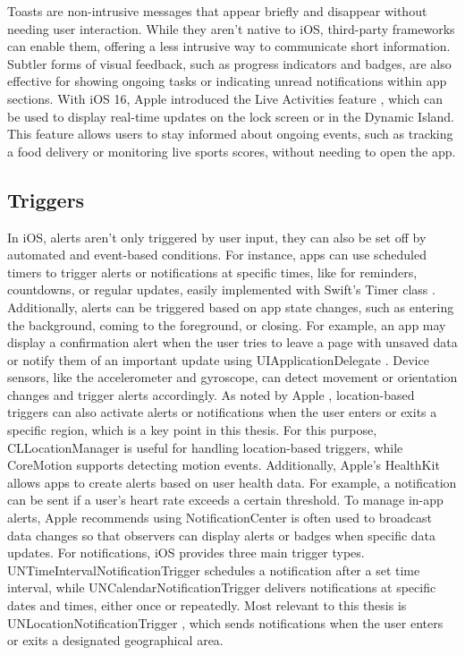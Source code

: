 Toasts are non-intrusive messages that appear briefly and disappear without needing user interaction. While they aren't native to iOS, third-party frameworks can enable them, offering a less intrusive way to communicate short information. Subtler forms of visual feedback, such as progress indicators and badges, are also effective for showing ongoing tasks or indicating unread notifications within app sections. 
With iOS 16, Apple introduced the Live Activities feature \cite{apple_live_activities}, which can be used to display real-time updates on the lock screen or in the Dynamic Island. This feature allows users to stay informed about ongoing events, such as tracking a food delivery or monitoring live sports scores, without needing to open the app.

\subsection{Triggers}
In iOS, alerts aren't only triggered by user input, they can also be set off by automated and event-based conditions. For instance, apps can use scheduled timers to trigger alerts or notifications at specific times, like for reminders, countdowns, or regular updates, easily implemented with Swift's Timer class \cite{apple_timer}.
Additionally, alerts can be triggered based on app state changes, such as entering the background, coming to the foreground, or closing. For example, an app may display a confirmation alert when the user tries to leave a page with unsaved data or notify them of an important update using UIApplicationDelegate \cite{apple_app_delegate}.
Device sensors, like the accelerometer and gyroscope, can detect movement or orientation changes and trigger alerts accordingly. As noted by Apple \cite{apple_corelocation}\cite{apple_coremotion}, location-based triggers can also activate alerts or notifications when the user enters or exits a specific region, which is a key point in this thesis. For this purpose, CLLocationManager is useful for handling location-based triggers, while CoreMotion supports detecting motion events. Additionally, Apple's HealthKit \cite{apple_healthkit} allows apps to create alerts based on user health data. For example, a notification can be sent if a user's heart rate exceeds a certain threshold.
To manage in-app alerts, Apple \cite{apple_notificationcenter} recommends using NotificationCenter is often used to broadcast data changes so that observers can display alerts or badges when specific data updates. For notifications, iOS provides three main trigger types. UNTimeIntervalNotificationTrigger \cite{apple_time_trigger} schedules a notification after a set time interval, while UNCalendarNotificationTrigger \cite{apple_calender_trigger} delivers notifications at specific dates and times, either once or repeatedly. Most relevant to this thesis is UNLocationNotificationTrigger \cite{apple_location_trigger}, which sends notifications when the user enters or exits a designated geographical area.

